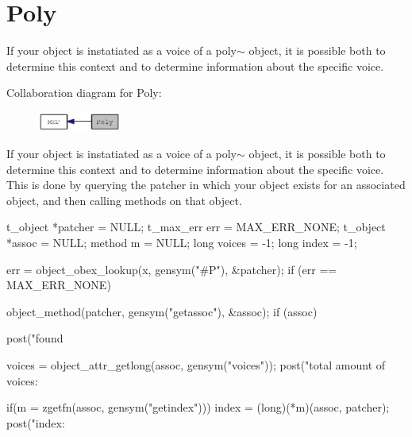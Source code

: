 \hypertarget{group__poly}{
\section{Poly}
\label{group__poly}
}


If your object is instatiated as a voice of a poly$\sim$ object, it is possible both to determine this context and to determine information about the specific voice.  


Collaboration diagram for Poly:\nopagebreak
\begin{figure}[H]
\begin{center}
\leavevmode
\includegraphics[width=78pt]{group__poly}
\end{center}
\end{figure}
If your object is instatiated as a voice of a poly$\sim$ object, it is possible both to determine this context and to determine information about the specific voice. This is done by querying the patcher in which your object exists for an associated object, and then calling methods on that object.


\begin{DoxyCode}
    t_object *patcher = NULL;
    t_max_err err = MAX_ERR_NONE;
    t_object *assoc = NULL;
    method m = NULL;
    long voices = -1;
    long index = -1;

    err = object_obex_lookup(x, gensym("#P"), &patcher);
    if (err == MAX_ERR_NONE) {
        object_method(patcher, gensym("getassoc"), &assoc);
        if (assoc) {
            post("found %

            voices = object_attr_getlong(assoc, gensym("voices"));
            post("total amount of voices: %

            if(m = zgetfn(assoc, gensym("getindex"))) 
                index = (long)(*m)(assoc, patcher);
            post("index: %
        }   
    }       
\end{DoxyCode}
 
